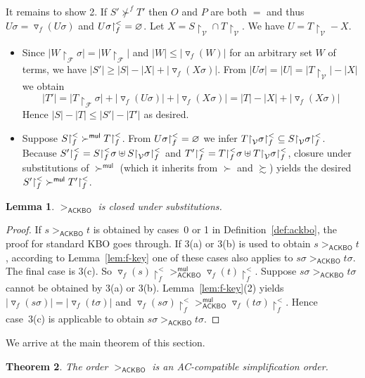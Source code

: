 \documentclass{tlp}
\newcommand{\qed}{\hspace*{1em}\hbox{\proofbox}}
\newtheorem{theorem}{Theorem}[section]
\newtheorem{lemma}[theorem]{Lemma}
\newcommand{\tf}[1]{{\triangledown_{\!#1}}}
\newcommand{\m}[1]{\mathsf{#1}}
\newcommand{\mc}[1]{\mathcal{#1}}
\newcommand{\mr}[1]{\mathrm{#1}}
\newcommand{\mul}{\m{mul}}
\newcommand{\FF}{\mc{F}}
\newcommand{\VV}{\mc{V}}
\newcommand{\ackbo}{\mr{\m{ACKBO}}}
\newcommand{\rrs}[3][f]{{#2}{\restriction}^{\smash{#3}}_{#1}}
\newcommand{\GT}{\mathrel{\succ}}
\newcommand{\GS}{\mathrel{\succsim}}
\newcommand{\NGT}{\mathrel{\nsucc}}
\begin{document}
\begin{proof*}
It remains to show 2. If $S' \NGT^f T'$ then $O$ and $P$ are both $=$
and thus $U\sigma = \tf{f}(U\sigma)$ and
$\rrs{U\sigma}{<} = \varnothing$.
Let $X = S{\restriction}_\VV \cap T{\restriction}_\VV$.
We have $U = T{\restriction}_\VV - X$.
\begin{itemize}
\item
Since $|W{\restriction}_\FF\sigma| = |W{\restriction}_\FF|$
and $|W| \leqslant |\tf{f}(W)|$ for an arbitrary set $W$ of terms,
we have $|S'| \geqslant |S| - |X| + |\tf{f}(X \sigma)|$.
From $|U\sigma| = |U| = |T{\restriction}_\VV| - |X|$ we obtain
\[
|T'| = |T{\restriction}_\FF \sigma| + |\tf{f}(U\sigma)| +
|\tf{f}(X \sigma)| = |T| - |X| + |\tf{f}(X \sigma)|
\]
Hence $|S| - |T| \leqslant |S'| - |T'|$ as desired.
\smallskip
\item
Suppose
$\rrs{S}{<} \GT^\mul \rrs{T}{<}$.
From $\rrs{U\sigma}{<} = \varnothing$ we infer
$\rrs{T{\restriction}_\VV\sigma}{<} \subseteq 
\rrs{S{\restriction}_\VV\sigma}{<}$.
Because 
\(
\rrs{S'}{<} = \rrs{S}{<}\sigma \uplus \rrs{S{\restriction}_\VV\sigma}{<}
\)
and 
\(
\rrs{T'}{<} = \rrs{T}{<}\sigma \uplus \rrs{T{\restriction}_\VV\sigma}{<}
\),
closure under substitutions of $\GT^\mul$ (which it inherits from 
$\GT$ and $\GS$) yields the desired
$\rrs{S'}{<} \GT^\mul \rrs{T'}{<}$.
\qed
\end{itemize}
\end{proof*}

\begin{lemma}
\label{lem:ackbo stable}
$>_\ackbo$ is closed under substitutions.
\end{lemma}
\begin{proof}
If $s >_\ackbo t$ is obtained by cases~0 or 1
in
Definition~\ref{def:ackbo}, the proof for standard KBO goes through.
If 3(a) or 3(b)
is used to obtain $s >_\ackbo t$,
according to Lemma~\ref{lem:f-key} one of these cases also applies to
$s\sigma >_\ackbo t\sigma$.
The final case is 3(c). So $\tf{f}(s){\restriction}_f^<
>_\ackbo^\mul \tf{f}(t){\restriction}_f^<$. Suppose 
$s\sigma >_\ackbo t\sigma$ cannot be obtained by
3(a) or 3(b). Lemma~\ref{lem:f-key}(2) yields
$|{\tf{f}(s\sigma)}| = |{\tf{f}(t\sigma)}|$ and
$\tf{f}(s\sigma){\restriction}_f^< >_\ackbo^\mul 
\tf{f}(t\sigma){\restriction}_f^<$.
Hence case~3(c) is applicable to obtain $s\sigma >_\ackbo t\sigma$.
\end{proof}

We arrive at the main theorem of this section.

\begin{theorem}
\label{thm:ackbo}
The order $>_\ackbo$ is an AC-compatible simplification order.
\qed
\end{theorem}
\end{document}
